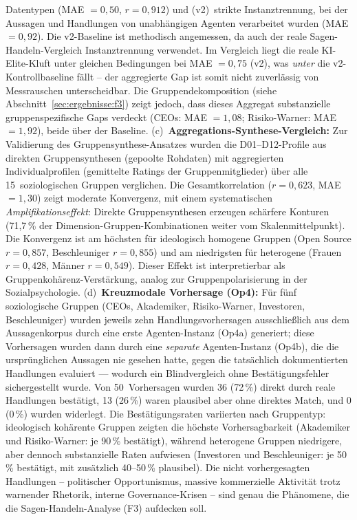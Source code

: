 \documentclass[12pt,a4paper]{article}
\begin{document}
Datentypen (MAE $= 0{,}50$, $r = 0{,}912$) und (v2)~strikte Instanztrennung, bei der Aussagen und Handlungen von unabh\"angigen Agenten verarbeitet wurden (MAE $= 0{,}92$). Die v2-Baseline ist methodisch angemessen, da auch der reale Sagen-Handeln-Vergleich Instanztrennung verwendet. Im Vergleich liegt die reale KI-Elite-Kluft unter gleichen Bedingungen bei MAE $= 0{,}75$ (v2), was \emph{unter} die v2-Kontrollbaseline f\"allt -- der aggregierte Gap ist somit nicht zuverl\"assig von Messrauschen unterscheidbar. Die Gruppendekomposition (siehe Abschnitt~\ref{sec:ergebnisse:f3}) zeigt jedoch, dass dieses Aggregat substanzielle gruppenspezifische Gaps verdeckt (CEOs: MAE $= 1{,}08$; Risiko-Warner: MAE $= 1{,}92$), beide \"uber der Baseline. (c)~\textbf{Aggregations-Synthese-Vergleich:} Zur Validierung des Gruppensynthese-Ansatzes wurden die D01--D12-Profile aus direkten Gruppensynthesen (gepoolte Rohdaten) mit aggregierten Individualprofilen (gemittelte Ratings der Gruppenmitglieder) \"uber alle 15~soziologischen Gruppen verglichen. Die Gesamtkorrelation ($r = 0{,}623$, MAE $= 1{,}30$) zeigt moderate Konvergenz, mit einem systematischen \emph{Amplifikationseffekt}: Direkte Gruppensynthesen erzeugen sch\"arfere Konturen (71{,}7\,\% der Dimension-Gruppen-Kombinationen weiter vom Skalenmittelpunkt). Die Konvergenz ist am h\"ochsten f\"ur ideologisch homogene Gruppen (Open Source $r = 0{,}857$, Beschleuniger $r = 0{,}855$) und am niedrigsten f\"ur heterogene (Frauen $r = 0{,}428$, M\"anner $r = 0{,}549$). Dieser Effekt ist interpretierbar als Gruppenkoh\"arenz-Verst\"arkung, analog zur Gruppenpolarisierung in der Sozialpsychologie. (d)~\textbf{Kreuzmodale Vorhersage (Op4):} F\"ur f\"unf soziologische Gruppen (CEOs, Akademiker, Risiko-Warner, Investoren, Beschleuniger) wurden jeweils zehn Handlungsvorhersagen ausschlie\ss{}lich aus dem Aussagenkorpus durch eine erste Agenten-Instanz (Op4a) generiert; diese Vorhersagen wurden dann durch eine \emph{separate} Agenten-Instanz (Op4b), die die urspr\"unglichen Aussagen nie gesehen hatte, gegen die tats\"achlich dokumentierten Handlungen evaluiert --- wodurch ein Blindvergleich ohne Best\"atigungsfehler sichergestellt wurde. Von 50~Vorhersagen wurden 36 (72\,\%) direkt durch reale Handlungen best\"atigt, 13 (26\,\%) waren plausibel aber ohne direktes Match, und 0 (0\,\%) wurden widerlegt. Die Best\"atigungsraten variierten nach Gruppentyp: ideologisch koh\"arente Gruppen zeigten die h\"ochste Vorhersagbarkeit (Akademiker und Risiko-Warner: je 90\,\% best\"atigt), w\"ahrend heterogene Gruppen niedrigere, aber dennoch substanzielle Raten aufwiesen (Investoren und Beschleuniger: je 50\,\% best\"atigt, mit zus\"atzlich 40--50\,\% plausibel). Die nicht vorhergesagten Handlungen -- politischer Opportunismus, massive kommerzielle Aktivit\"at trotz warnender Rhetorik, interne Governance-Krisen -- sind genau die Ph\"anomene, die die Sagen-Handeln-Analyse (F3) aufdecken soll.
\end{document}
